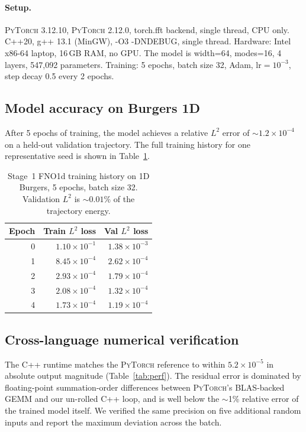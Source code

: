 \documentclass[10pt,twocolumn]{article}
\renewcommand{\texttt}[1]{{\normalfont\ttfamily #1}\normalfont\rmfamily}
\newcommand{\py}{\textsc{PyTorch}}
\begin{document}
\paragraph{Setup.}
\py{} 3.12.10, \py{} 2.12.0, \texttt{torch.fft} backend, single
thread, CPU only.  C{++}20, g++ 13.1 (MinGW), \texttt{-O3
-DNDEBUG}, single thread.  Hardware: Intel x86-64 laptop, 16\,GB
RAM, no GPU.  The model is width=64, modes=16, 4 layers,
547{,}092 parameters.  Training: 5 epochs, batch size 32, Adam,
$\mathrm{lr}=10^{-3}$, step decay 0.5 every 2 epochs.

\subsection{Model accuracy on Burgers 1D}

After 5 epochs of training, the model achieves a relative $L^2$
error of $\sim 1.2 \times 10^{-4}$ on a held-out validation
trajectory.  The full training history for one representative
seed is shown in Table~\ref{tab:training}.

\begin{table}[t]
  \centering
  \small
  \begin{tabular}{rrr}
    \toprule
    Epoch & Train $L^2$ loss & Val $L^2$ loss\\
    \midrule
    0 & $1.10 \times 10^{-1}$ & $1.38 \times 10^{-3}$\\
    1 & $8.45 \times 10^{-4}$ & $2.62 \times 10^{-4}$\\
    2 & $2.93 \times 10^{-4}$ & $1.79 \times 10^{-4}$\\
    3 & $2.08 \times 10^{-4}$ & $1.32 \times 10^{-4}$\\
    4 & $1.73 \times 10^{-4}$ & $1.19 \times 10^{-4}$\\
    \bottomrule
  \end{tabular}
  \caption{Stage~1 FNO1d training history on 1D Burgers, 5 epochs,
  batch size 32.  Validation $L^2$ is $\sim 0.01\%$ of the
  trajectory energy.}
  \label{tab:training}
\end{table}

\subsection{Cross-language numerical verification}

The C{++} runtime matches the \py{} reference to within
$5.2 \times 10^{-5}$ in absolute output magnitude (Table~\ref{tab:perf}).
The residual error is dominated by floating-point summation-order
differences between \py{}'s BLAS-backed GEMM and our un-rolled
C{++} loop, and is well below the $\sim$1\% relative error of
the trained model itself.  We verified the same precision on
five additional random inputs and report the maximum deviation
across the batch.
\end{document}

